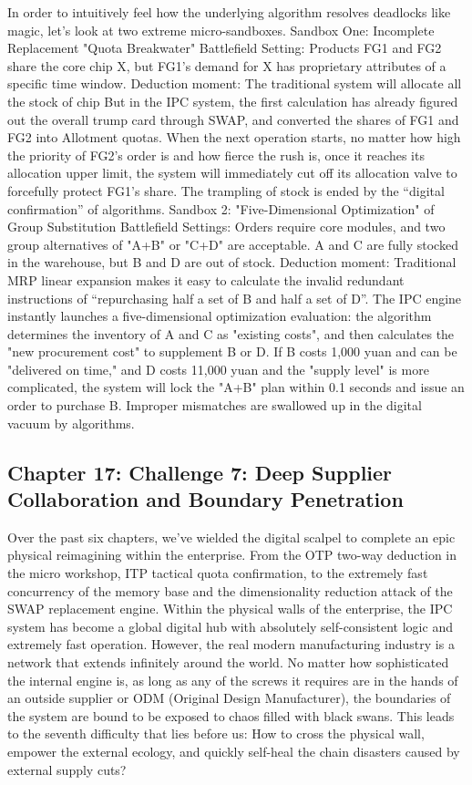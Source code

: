 \documentclass[11pt,a4paper]{article}
\begin{document}
In order to intuitively feel how the underlying algorithm resolves deadlocks like magic, let's look at two extreme micro-sandboxes. Sandbox One: Incomplete Replacement "Quota Breakwater" Battlefield Setting: Products FG1 and FG2 share the core chip X, but FG1's demand for X has proprietary attributes of a specific time window. Deduction moment: The traditional system will allocate all the stock of chip But in the IPC system, the first calculation has already figured out the overall trump card through SWAP, and converted the shares of FG1 and FG2 into Allotment quotas. When the next operation starts, no matter how high the priority of FG2's order is and how fierce the rush is, once it reaches its allocation upper limit, the system will immediately cut off its allocation valve to forcefully protect FG1's share. The trampling of stock is ended by the “digital confirmation” of algorithms. Sandbox 2: "Five-Dimensional Optimization" of Group Substitution Battlefield Settings: Orders require core modules, and two group alternatives of "A+B" or "C+D" are acceptable. A and C are fully stocked in the warehouse, but B and D are out of stock. Deduction moment: Traditional MRP linear expansion makes it easy to calculate the invalid redundant instructions of “repurchasing half a set of B and half a set of D”. The IPC engine instantly launches a five-dimensional optimization evaluation: the algorithm determines the inventory of A and C as "existing costs", and then calculates the "new procurement cost" to supplement B or D. If B costs 1,000 yuan and can be "delivered on time," and D costs 11,000 yuan and the "supply level" is more complicated, the system will lock the "A+B" plan within 0.1 seconds and issue an order to purchase B. Improper mismatches are swallowed up in the digital vacuum by algorithms.

\subsection*{Chapter 17: Challenge 7: Deep Supplier Collaboration and Boundary Penetration}
Over the past six chapters, we’ve wielded the digital scalpel to complete an epic physical reimagining within the enterprise. From the OTP two-way deduction in the micro workshop, ITP tactical quota confirmation, to the extremely fast concurrency of the memory base and the dimensionality reduction attack of the SWAP replacement engine. Within the physical walls of the enterprise, the IPC system has become a global digital hub with absolutely self-consistent logic and extremely fast operation. However, the real modern manufacturing industry is a network that extends infinitely around the world. No matter how sophisticated the internal engine is, as long as any of the screws it requires are in the hands of an outside supplier or ODM (Original Design Manufacturer), the boundaries of the system are bound to be exposed to chaos filled with black swans. This leads to the seventh difficulty that lies before us: How to cross the physical wall, empower the external ecology, and quickly self-heal the chain disasters caused by external supply cuts?
\end{document}
